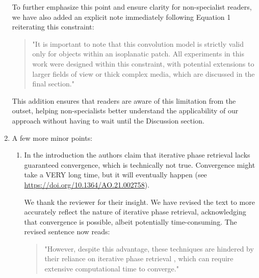 \documentclass[12pt]{article}
\newcommand{\hlred}[1]{\sethlcolor{red!30}\hl{#1}}
\newenvironment{solved_reviewercomment}
    {\begin{tcolorbox}[width=\linewidth,colback=gray!5,colframe=solved_commentcolor!50,title=Reviewer Comment,left=5pt,right=5pt]}
    {\end{tcolorbox}}
\newenvironment{ourresponse}
    {\begin{tcolorbox}[width=\linewidth,breakable,enhanced,colback=gray!5,colframe=responsecolor!50,title=Response,left=5pt,right=5pt]}
    {\end{tcolorbox}}
\begin{document}
\begin{enumerate}[label=\arabic*.]
\begin{ourresponse}
        To further emphasize this point and ensure clarity for non-specialist readers, we have also added an explicit note immediately following Equation 1 reiterating this constraint:
        
        \begin{quote}
            "It is important to note that this convolution model is strictly valid only for objects within an isoplanatic patch. All experiments in this work were designed within this constraint, with potential extensions to larger fields of view or thick complex media, which are discussed in the final section."
        \end{quote}
        
        This addition ensures that readers are aware of this limitation from the outset, helping non-specialists better understand the applicability of our approach without having to wait until the Discussion section.
    \end{ourresponse}
    
    \item A few more minor points:
    \begin{enumerate}[label=3.\alph*.]
        \item \leavevmode\vspace{-\baselineskip}
        \begin{solved_reviewercomment}
            In the introduction the authors claim that iterative phase retrieval lacks guaranteed convergence, which is technically not true. Convergence might take a VERY long time, but it will eventually happen (see \url{https://doi.org/10.1364/AO.21.002758}).
        \end{solved_reviewercomment}

           
        \begin{ourresponse}
            We thank the reviewer for their insight. We have revised the text to more accurately reflect the nature of iterative phase retrieval, acknowledging that convergence is possible, albeit potentially time-consuming. The revised sentence now reads:  
            \begin{quote}
                "However, despite this advantage, these techniques are hindered by their reliance on iterative phase retrieval \cite{fienup1978reconstruction}, which can require extensive computational time to converge."
            \end{quote}
            

\end{ourresponse}
\end{enumerate}
\end{enumerate}
\end{document}
